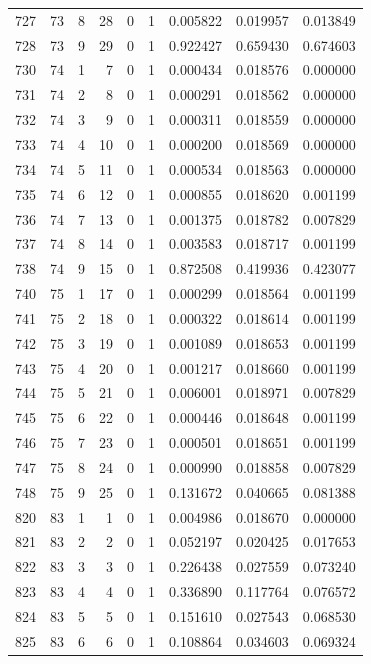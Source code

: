 \begin{longtable}{rrrrrrrrr}
727 & 73 & 8 & 28 & 0 & 1 & 0.005822 & 0.019957 & 0.013849 \\
728 & 73 & 9 & 29 & 0 & 1 & 0.922427 & 0.659430 & 0.674603 \\
730 & 74 & 1 & 7 & 0 & 1 & 0.000434 & 0.018576 & 0.000000 \\
731 & 74 & 2 & 8 & 0 & 1 & 0.000291 & 0.018562 & 0.000000 \\
732 & 74 & 3 & 9 & 0 & 1 & 0.000311 & 0.018559 & 0.000000 \\
733 & 74 & 4 & 10 & 0 & 1 & 0.000200 & 0.018569 & 0.000000 \\
734 & 74 & 5 & 11 & 0 & 1 & 0.000534 & 0.018563 & 0.000000 \\
735 & 74 & 6 & 12 & 0 & 1 & 0.000855 & 0.018620 & 0.001199 \\
736 & 74 & 7 & 13 & 0 & 1 & 0.001375 & 0.018782 & 0.007829 \\
737 & 74 & 8 & 14 & 0 & 1 & 0.003583 & 0.018717 & 0.001199 \\
738 & 74 & 9 & 15 & 0 & 1 & 0.872508 & 0.419936 & 0.423077 \\
740 & 75 & 1 & 17 & 0 & 1 & 0.000299 & 0.018564 & 0.001199 \\
741 & 75 & 2 & 18 & 0 & 1 & 0.000322 & 0.018614 & 0.001199 \\
742 & 75 & 3 & 19 & 0 & 1 & 0.001089 & 0.018653 & 0.001199 \\
743 & 75 & 4 & 20 & 0 & 1 & 0.001217 & 0.018660 & 0.001199 \\
744 & 75 & 5 & 21 & 0 & 1 & 0.006001 & 0.018971 & 0.007829 \\
745 & 75 & 6 & 22 & 0 & 1 & 0.000446 & 0.018648 & 0.001199 \\
746 & 75 & 7 & 23 & 0 & 1 & 0.000501 & 0.018651 & 0.001199 \\
747 & 75 & 8 & 24 & 0 & 1 & 0.000990 & 0.018858 & 0.007829 \\
748 & 75 & 9 & 25 & 0 & 1 & 0.131672 & 0.040665 & 0.081388 \\
820 & 83 & 1 & 1 & 0 & 1 & 0.004986 & 0.018670 & 0.000000 \\
821 & 83 & 2 & 2 & 0 & 1 & 0.052197 & 0.020425 & 0.017653 \\
822 & 83 & 3 & 3 & 0 & 1 & 0.226438 & 0.027559 & 0.073240 \\
823 & 83 & 4 & 4 & 0 & 1 & 0.336890 & 0.117764 & 0.076572 \\
824 & 83 & 5 & 5 & 0 & 1 & 0.151610 & 0.027543 & 0.068530 \\
825 & 83 & 6 & 6 & 0 & 1 & 0.108864 & 0.034603 & 0.069324 \\

\end{longtable}
